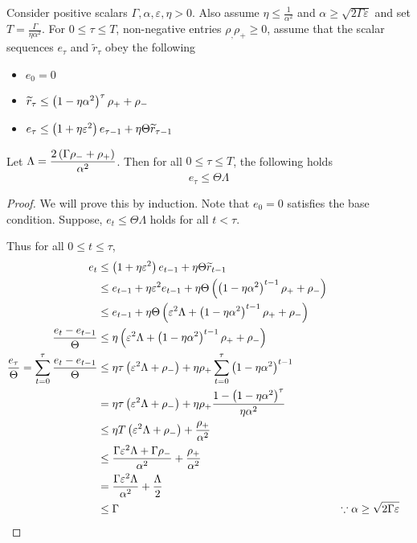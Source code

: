 \documentclass[a4paper]{article}
\let\temp\epsilon
\let\epsilon\varepsilon
\let\varepsilon\temp
\begin{document}
\begin{lem}[Lemma 6.8]\label{eq:growth-pert-lemma}
  Consider positive scalars $\Gamma,\alpha,\epsilon,\eta>0$. Also
  assume $\eta\le\frac{1}{\alpha^2}$ and
  $\alpha\ge\sqrt{2\Gamma\epsilon}$ and set
  $T=\frac{\Gamma}{\eta\alpha^2}$. For $0\le
  \tau\le T$, non-negative entries $\rho_,\rho_+\ge 0$, assume that the scalar sequences
  $e_\tau$ and $\widetilde{r}_\tau$ obey the following 
  \begin{itemize}
  \item $e_0 = 0$
  \item $\widetilde{r}_\tau\le\left({1 - \eta\alpha^2}\right)^\tau \rho_+ +
    \rho_-$
  \item $e_\tau\le \br{1 + \eta\epsilon^2}e_{\tau -1} +
    \eta\Theta\widetilde{r}_{\tau - 1}$
  \end{itemize}
  
  Let  $\Lambda = \dfrac{2\left({\Gamma\rho_- + \rho_+}\right)}{\alpha^2}$. Then for all $0\le\tau\le T$, the following holds
  \[e_\tau\le \Theta\Lambda\]
\end{lem}
\begin{proof}
  We will prove this by induction. Note that $e_0=0$ satisfies the
  base condition. Suppose, $e_{t}\le\Theta\Lambda$ holds for all
  $t <\tau$.

  Thus for all $ 0\le t\le \tau$,
  \begin{align*}
    e_{t}&\le \br{1 + \eta\epsilon^2}e_{t -
              1}+\eta\Theta\widetilde{r}_{t-1}\\
            &\le e_{t - 1} + \eta\epsilon^2e_{t-1} +
              \eta\Theta\br{\br{1-\eta\alpha^2}^{t-1}\rho_+ +
              \rho_-}\\
            &\le e_{t-1} + \eta\Theta\br{\epsilon^2\Lambda + \br{1-\eta\alpha^2}^{t-1}\rho_+ +
              \rho_- }\\
              \dfrac{  e_{t} -
    e_{t-1}}{\Theta}&\le \eta\br{\epsilon^2\Lambda + \br{1 -
                         \eta\alpha^2}^{t-1}\rho_++\rho_-}\\
              \dfrac{  e_{\tau}}{\Theta} = \sum_{t=0}^\tau  \dfrac{  e_{t} -
    e_{t-1}}{\Theta} &\le \eta\tau\br{\epsilon^2\Lambda + \rho_-}+ \eta\rho_+\sum_{t=0}^{\tau}{\br{1 -
                       \eta\alpha^2}^{t-1}}\\
         &=\eta\tau\br{\epsilon^2\Lambda + \rho_-}+ \eta\rho_+\dfrac{1
           - \br{1 -
                       \eta\alpha^2}^{\tau}}{\eta\alpha^2}\\
         &\le\eta T\br{\epsilon^2\Lambda + \rho_-}+ \dfrac{\rho_+}{\alpha^2}\\
         &\le \dfrac{\Gamma\epsilon^2\Lambda +
           \Gamma\rho_-}{\alpha^2}+ \dfrac{\rho_+}{\alpha^2}\\
    &= \dfrac{\Gamma\epsilon^2\Lambda}{\alpha^2}+
      \dfrac{\Lambda}{2}\\
         &\le \Gamma &&\because \alpha \ge \sqrt{2\Gamma\epsilon}
  \end{align*}
\end{proof}
\end{document}
